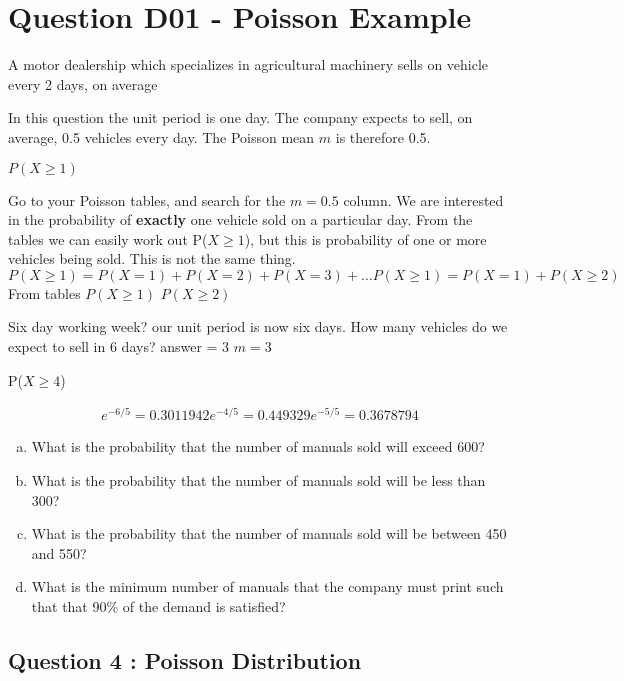 \documentclass[a4paper,12pt]{article}
\begin{document}
\section{Question D01  - Poisson Example}
A motor dealership which specializes in agricultural machinery sells on vehicle every 2 days, on average

In this question the unit period is one day. The company expects to sell, on average, 0.5 vehicles every day.
The Poisson mean $m$ is therefore 0.5.

$P(X \geq 1)$

Go to your Poisson tables, and search for the $m=0.5$ column.
We are interested in the probability of \textbf{exactly} one vehicle sold on a particular day.
From the tables we can easily work out P($X \geq 1$), but this is probability of one or more vehicles being sold.
This is not the same thing.
\[P(X \geq 1) = P(X =1) + P( X=2) + P(X=3) + \ldots
P(X \geq 1) = P(X=1) + P(X \geq 2)\]
From tables
$P(X \geq 1)$
$P(X \geq 2)$

Six day working week?
our unit period is now six days.
How many vehicles do we expect to sell in 6 days?
answer = 3
$m=3$

P($X\geq 4$)

\begin{eqnarray}
e^{-6/5} = 0.3011942
e^{-4/5} = 0.449329
e^{-5/5} = 0.3678794
\end{eqnarray}

\begin{enumerate}[(a)]
\item What is the probability that the number of manuals sold will exceed 600?
\item What is the probability that the number of manuals sold will be less than 300?
\item What is the probability that the number of manuals sold will be between 450 and 550?
\item What is the minimum number of manuals that the company must print such
that that 90\% of the demand is satisfied?
\end{enumerate}






\subsection{Question 4 : Poisson Distribution}
\end{document}

